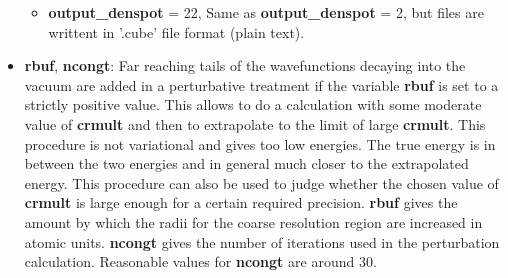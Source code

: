 \documentclass[a4paper,11pt]{report}
\begin{document}
\begin{itemize}
\begin{itemize}
       \item {\bf output\_denspot} = 22, Same as {\bf output\_denspot} = 2, but files are writtent in '.cube' file format (plain text).
      \end{itemize}
\item {\bf rbuf}, {\bf ncongt}:  Far reaching tails of the wavefunctions decaying into the vacuum are  
      added in a perturbative treatment if the variable {\bf rbuf} is set to a strictly positive value. 
      This allows to do a calculation with some moderate 
      value of {\bf crmult} and then to extrapolate to the limit of large  {\bf crmult}. 
      This procedure is not variational and gives too low energies. The true energy is 
      in between the two energies and in general much closer to the extrapolated energy. 
      This procedure can also be used to judge whether the chosen value of  {\bf crmult} is 
      large enough for a certain required precision.
      {\bf rbuf} gives the amount by which the radii for the coarse resolution region 
      are increased in atomic units. {\bf ncongt} gives the number of iterations used 
      in the perturbation calculation. Reasonable values for {\bf ncongt} are around 30.  


\end{itemize}
\end{document}
